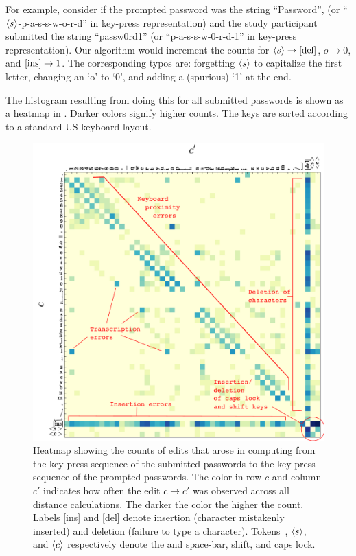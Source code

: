 For example, consider if the prompted password was the string ``Password'', (or
``{$\langle s \rangle$-p-a-s-s-w-o-r-d}'' in key-press representation) and the study
participant submitted the string ``passw0rd1'' (or ``{p-a-s-s-w-0-r-d-1}'' in
key-press representation). Our algorithm would increment the counts for
$\langle s \rangle \rightarrow \textnormal{[del]}$, $o \rightarrow 0$, and
$\textnormal{[ins]}\rightarrow 1$. The corresponding typos are: forgetting $\langle s \rangle$ to
capitalize the first letter, changing an `o' to `0', and adding a (spurious) `1' at the end. 

The histogram resulting from doing this for all submitted passwords is shown as
a heatmap in . Darker colors signify
higher counts.  The keys are sorted according to a standard 
US keyboard layout.



\begin{figure}[t]
  \includegraphics[height=0.48\textwidth]{images/heatmap}
  \caption{Heatmap showing the counts of edits that arose in computing
    \edistname from the key-press sequence of the submitted passwords
    to the key-press sequence of the prompted passwords. The color in
    row $c$ and column $c'$ indicates how often the edit
    $c \rightarrow c'$ was observed across all distance
    calculations. The darker the color the higher the count.  Labels
    [ins] and [del] denote insertion (character mistakenly inserted)
    and deletion (failure to type a character). Tokens \textvisiblespace $\,$, $\langle s \rangle$, and $\langle c \rangle$
respectively denote the and space-bar, shift, and caps lock.}
  \label{fig:heatmap}
\end{figure}


